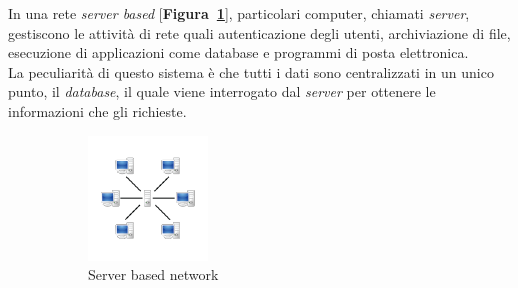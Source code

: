 \documentclass[11pt]{thesistemp}
\begin{document}
In una rete \textit{server based} [\textbf{Figura~\ref{fig:server-based-net}}], particolari computer, chiamati \textit{server}, gestiscono le attività di rete quali autenticazione degli utenti, archiviazione di file, esecuzione di applicazioni come database e programmi di posta elettronica.\\
La peculiarità di questo sistema è che tutti i dati sono centralizzati in un unico punto, il \textit{database}, il quale viene interrogato dal \textit{server} per ottenere le informazioni che gli richieste.
\begin{figure}[h]
    \centering
    \begin{subfigure}[h]{0.3\textwidth}
        \includegraphics[width=\textwidth]{server-based-net.png}
        \caption{Server based network}
        \label{fig:server-based-net}
    \end{subfigure}\qquad
    \begin{subfigure}[h]{0.3\textwidth}

\end{subfigure}
\end{figure}
\end{document}
